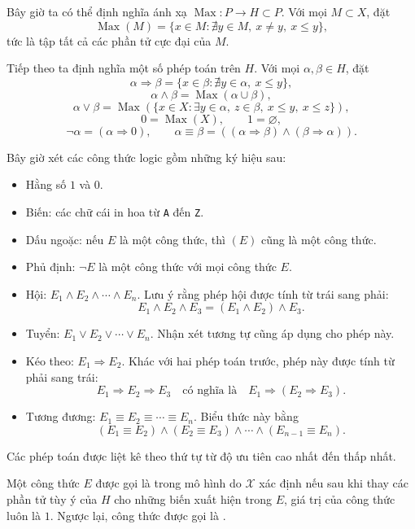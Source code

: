 \documentclass[11pt]{article}
\begin{document}
Bây giờ ta có thể định nghĩa ánh xạ \(\operatorname{Max}:P\to H\subset P\).
Với mọi \(M\subset X\), đặt
\[
  \operatorname{Max}(M)
  =\{x\in M:\nexists y\in M,\ x\ne y,\ x\le y\},
\]
tức là tập tất cả các phần tử cực đại của \(M\).

Tiếp theo ta định nghĩa một số phép toán trên \(H\). Với mọi
\(\alpha,\beta\in H\), đặt
\[
  \alpha\Rightarrow\beta
  =\{x\in\beta:\nexists y\in\alpha,\ x\le y\},
\]
\[
  \alpha\land\beta=\operatorname{Max}(\alpha\cup\beta),
\]
\[
  \alpha\lor\beta
  =\operatorname{Max}(\{x\in X:\exists y\in\alpha,\ z\in\beta,\ x\le y,\ x\le z\}),
\]
\[
  0=\operatorname{Max}(X),\qquad 1=\varnothing,
\]
\[
  \neg\alpha=(\alpha\Rightarrow 0),\qquad
  \alpha\equiv\beta=((\alpha\Rightarrow\beta)\land(\beta\Rightarrow\alpha)).
\]

Bây giờ xét các công thức logic gồm những ký hiệu sau:

\begin{itemize}
  \item Hằng số \(1\) và \(0\).
  \item Biến: các chữ cái in hoa từ \texttt{A} đến \texttt{Z}.
  \item Dấu ngoặc: nếu \(E\) là một công thức, thì \((E)\) cũng là một công
  thức.
  \item Phủ định: \(\neg E\) là một công thức với mọi công thức \(E\).
  \item Hội: \(E_1\land E_2\land\cdots\land E_n\). Lưu ý rằng phép hội được
  tính từ trái sang phải:
  \[
    E_1\land E_2\land E_3=(E_1\land E_2)\land E_3.
  \]
  \item Tuyển: \(E_1\lor E_2\lor\cdots\lor E_n\). Nhận xét tương tự cũng áp
  dụng cho phép này.
  \item Kéo theo: \(E_1\Rightarrow E_2\). Khác với hai phép toán trước, phép
  này được tính từ phải sang trái:
  \[
    E_1\Rightarrow E_2\Rightarrow E_3
    \quad\text{có nghĩa là}\quad
    E_1\Rightarrow(E_2\Rightarrow E_3).
  \]
  \item Tương đương: \(E_1\equiv E_2\equiv\cdots\equiv E_n\). Biểu thức này
  bằng
  \[
    (E_1\equiv E_2)\land(E_2\equiv E_3)\land\cdots\land(E_{n-1}\equiv E_n).
  \]
\end{itemize}

Các phép toán được liệt kê theo thứ tự từ độ ưu tiên cao nhất đến thấp nhất.

Một công thức \(E\) được gọi là  trong mô hình do \(\mathcal X\)
xác định nếu sau khi thay các phần tử tùy ý của \(H\) cho những biến xuất hiện
trong \(E\), giá trị của công thức luôn là \(1\). Ngược lại, công thức được gọi
là .
\end{document}
